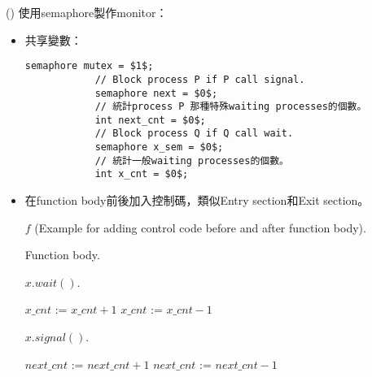 \begin{theorem}{()} 使用semaphore製作monitor：\begin{itemize}
        \item 共享變數：\begin{lstlisting}[caption={Shared variables of making monitor using semaphore.}, captionpos=b, mathescape=true]
            semaphore mutex = $1$;
            // Block process P if P call signal. 
            semaphore next = $0$;
            // 統計process P 那種特殊waiting processes的個數。 
            int next_cnt = $0$;
            // Block process Q if Q call wait.
            semaphore x_sem = $0$;
            // 統計一般waiting processes的個數。
            int x_cnt = $0$; 
        \end{lstlisting}
        \item 在function body前後加入控制碼，類似Entry section和Exit section。
        \begin{algorithm}[H]
            \caption{$f$ (Example for adding control code before and after function body).}
            \begin{algorithmic}[1]
                    \State {}
                    \State Function body.
                        \State {}
                    \Else
                        \State {}
                    \EndIf
                \EndFunction
            \end{algorithmic}
        \end{algorithm}
        \begin{algorithm}[H]
            \caption{$x.wait()$.}
            \begin{algorithmic}[1]
                    \State $x\_cnt$ := $x\_cnt + 1$
                        \State {}
                    \Else
                        \State {}
                    \EndIf
                    \State {} 
                    \State $x\_cnt$ := $x\_cnt - 1$ 
                \EndFunction
            \end{algorithmic}
        \end{algorithm}
        \begin{algorithm}[H]
            \caption{$x.signal()$.}
            \begin{algorithmic}[1]
                        \State $next\_cnt$ := $next\_cnt + 1$
                        \State {}
                        \State {} 
                        \State $next\_cnt$ := $next\_cnt - 1$ 
                    \EndIf
                \EndFunction
            \end{algorithmic}
        \end{algorithm}
    \end{itemize}
\end{theorem}
